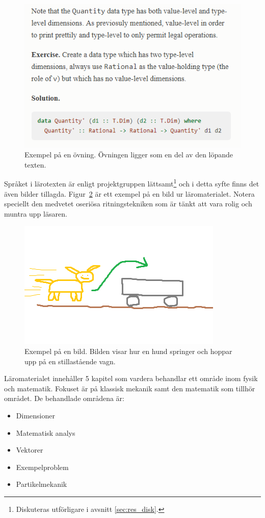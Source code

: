 \begin{figure}[tph]
    \centering
    \includegraphics[width=0.4\linewidth]{figure/smakprov_ovning.png}
    \caption{Exempel på en övning. Övningen ligger som en del av den löpande texten.}
    \label{fig:smakprov_ovning}
\end{figure}

Språket i lärotexten är enligt projektgruppen lättsamt\footnote{Diskuteras
utförligare i avsnitt \ref{sec:res_disk}.} och i detta syfte finns det även
bilder tillagda. Figur~\ref{fig:smakprov_bild_laromaterial} är ett exempel på en
bild ur läromaterialet. Notera speciellt den medvetet oseriösa ritningstekniken
som är tänkt att vara rolig och muntra upp läsaren.

\begin{figure}[tph]
        \centering
        \includegraphics[width=0.4\linewidth]{figure/smakprov_bild_laromaterial.png}
        \caption{Exempel på en bild. Bilden visar hur en hund springer och hoppar upp på en stillastående vagn.}
        \label{fig:smakprov_bild_laromaterial}
\end{figure}

Läromaterialet innehåller 5 kapitel som vardera behandlar ett område inom fysik
och matematik. Fokuset är på klassisk mekanik samt den matematik som tillhör
området. De behandlade områdena är:

\begin{itemize}
  \item Dimensioner
  \item Matematisk analys
  \item Vektorer
  \item Exempelproblem
  \item Partikelmekanik
\end{itemize}

